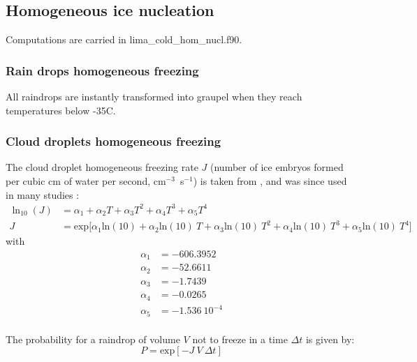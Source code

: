 \subsection{Homogeneous ice nucleation}

Computations are carried in lima\_cold\_hom\_nucl.f90.

\subsubsection{Rain drops homogeneous freezing}

All raindrops are instantly transformed into graupel when they reach temperatures below -35\textdegree C.

\subsubsection{Cloud droplets homogeneous freezing}

The cloud droplet homogeneous freezing rate $J$ (number of ice embryos formed per cubic cm of water per second, cm$^{-3}$~s$^{-1}$) is taken from \citet{Eadie1971}, and was since used in many studies \citep[e.g.][]{Heymsfield1993,DeMott1994,Milbrandt2005b}:
\begin{align}
 \ln_{10}(J) &= \alpha_1 + \alpha_2 T + \alpha_3 T^2 +  \alpha_4 T^3 + \alpha_5 T^4 \\
 J &= \mathrm{exp} \Big[ \alpha_1 \mathrm{ln}(10) + \alpha_2 \mathrm{ln}(10)~T + \alpha_3 \mathrm{ln}(10)~T^2 +  \alpha_4 \mathrm{ln}(10)~T^3 + \alpha_5 \mathrm{ln}(10)~T^4 \Big]
\end{align}
with
\begin{align}
 \alpha_1 &= -606.3952 \\
 \alpha_2 &= -52.6611 \\
 \alpha_3 &= -1.7439 \\
 \alpha_4 &= -0.0265 \\
 \alpha_5 &= -1.536~10^{-4}\\
\end{align}

The probability for a raindrop of volume $V$ not to freeze in a time $\Delta t$ is given by:
\begin{equation}
 P = \mathrm{exp} [ -J~V~\Delta t ]
\end{equation}

